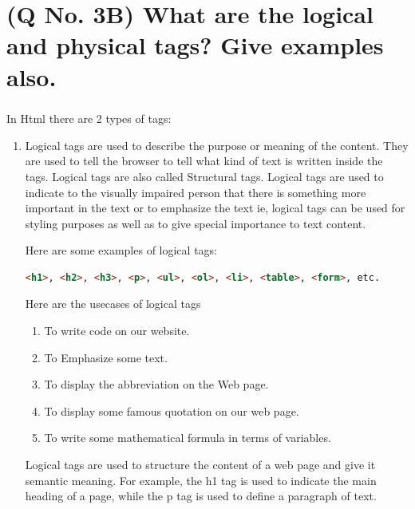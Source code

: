 \documentclass[11pt]{article}
\begin{document}
\section{(Q No. 3B) What are the logical and physical tags? Give examples also.}
\subparagraph{}
In Html there are 2 types of tags: 
\begin{enumerate}
    \item Logical tags are used to describe the purpose or meaning of the content. They are used to tell the browser to tell what kind of text is written inside the tags. 
    Logical tags are also called Structural tags.
    Logical tags are used to indicate to the visually impaired person that there is something more important in the text or to emphasize the text ie, logical tags can be used for styling purposes as well as to give special importance to text content.

    Here are some examples of logical tags:
\begin{lstlisting}[language=html, caption=logical tags]
    <h1>, <h2>, <h3>, <p>, <ul>, <ol>, <li>, <table>, <form>, etc.
\end{lstlisting} 

Here are the usecases of logical tags
    \begin{enumerate}
        \item To write code on our website.
        \item To Emphasize some text.
        \item To display the abbreviation on the Web page.
        \item To display some famous quotation on our web page.
        \item To write some mathematical formula in terms of variables.
    \end{enumerate}
    
    Logical tags are used to structure the content of a web page and give it semantic meaning. For example, the \textlangle h1 \textrangle tag is used to indicate the main heading of a page, while the \textlangle p \textrangle tag is used to define a paragraph of text.
    

\end{enumerate}
\end{document}
